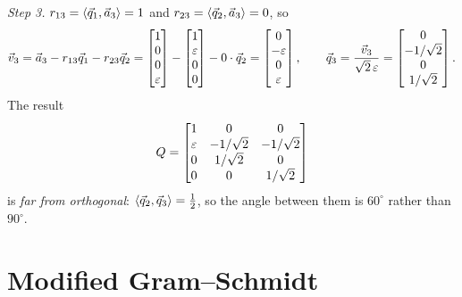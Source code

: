 \begin{example}
  \emph{Step 3.} $r_{13} = \left\langle \vec{q}_1, \vec{a}_3 \right\rangle = 1$ and $r_{23} = \left\langle \vec{q}_2, \vec{a}_3 \right\rangle = 0$, so
  \begin{equation}
    \vec{v}_3 = \vec{a}_3 - r_{13}\vec{q}_1 - r_{23}\vec{q}_2 = \begin{bmatrix} 1 \\ 0 \\ 0 \\ \varepsilon \end{bmatrix} - \begin{bmatrix} 1 \\ \varepsilon \\ 0 \\ 0 \end{bmatrix} - 0 \cdot \vec{q}_2 = \begin{bmatrix} 0 \\ -\varepsilon \\ 0 \\ \varepsilon \end{bmatrix}, \qquad
    \vec{q}_3 = \frac{\vec{v}_3}{\sqrt{2}\,\varepsilon} = \begin{bmatrix} 0 \\ -1/\sqrt{2} \\ 0 \\ 1/\sqrt{2} \end{bmatrix}.
  \end{equation}
  The result
  \begin{equation}
    Q = \begin{bmatrix} 1 & 0 & 0 \\ \varepsilon & -1/\sqrt{2} & -1/\sqrt{2} \\ 0 & 1/\sqrt{2} & 0 \\ 0 & 0 & 1/\sqrt{2} \end{bmatrix}
  \end{equation}
  is \emph{far from orthogonal}: $\left\langle \vec{q}_2, \vec{q}_3 \right\rangle = \frac{1}{2}$, so the angle between them is $60^\circ$ rather than $90^\circ$.
\end{example}

\section{Modified Gram--Schmidt}

